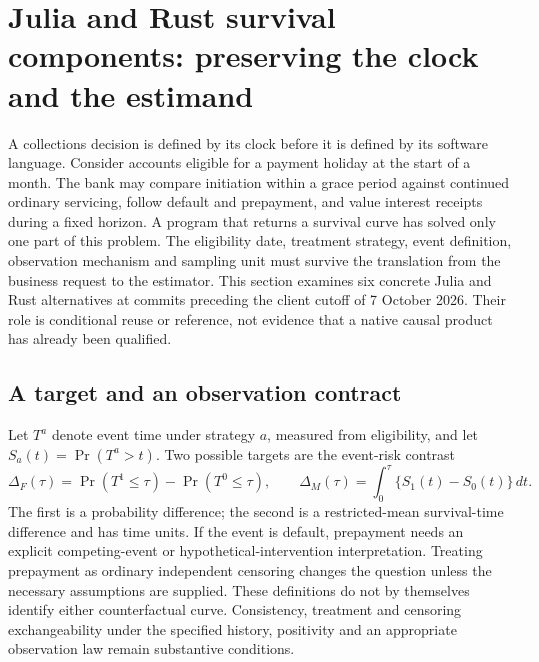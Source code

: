 \section{Julia and Rust survival components: preserving the clock and the estimand}
\label{sec:exec24-longitudinal-other}

A collections decision is defined by its clock before it is defined by its software language.
Consider accounts eligible for a payment holiday at the start of a month. The bank may
compare initiation within a grace period against continued ordinary servicing, follow
default and prepayment, and value interest receipts during a fixed horizon. A program
that returns a survival curve has solved only one part of this problem. The eligibility
date, treatment strategy, event definition, observation mechanism and sampling unit
must survive the translation from the business request to the estimator. This section
examines six concrete Julia and Rust alternatives at commits preceding the client
cutoff of 7 October 2026. Their role is conditional reuse or reference, not evidence
that a native causal product has already been qualified.

\subsection{A target and an observation contract}
Let $T^a$ denote event time under strategy $a$, measured from eligibility, and let
$S_a(t)=\Pr(T^a>t)$. Two possible targets are the event-risk contrast
\begin{equation}
 \Delta_F(\tau)=\Pr(T^1\leq\tau)-\Pr(T^0\leq\tau),
 \qquad
 \Delta_M(\tau)=\int_0^\tau\{S_1(t)-S_0(t)\}\,dt.
\end{equation}
The first is a probability difference; the second is a restricted-mean survival-time
difference and has time units. If the event is default, prepayment needs an explicit
competing-event or hypothetical-intervention interpretation. Treating prepayment as
ordinary independent censoring changes the question unless the necessary assumptions
are supplied. These definitions do not by themselves identify either counterfactual
curve. Consistency, treatment and censoring exchangeability under the specified
history, positivity and an appropriate observation law remain substantive conditions.

